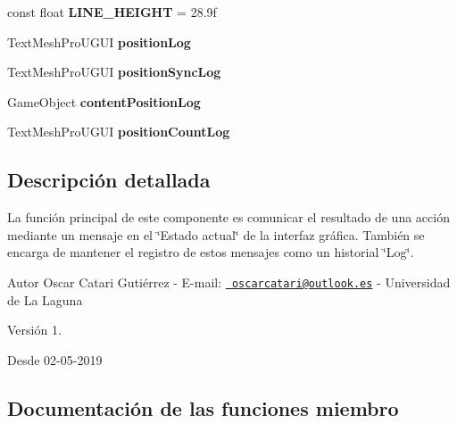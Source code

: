 \begin{DoxyCompactItemize}
const float {\bfseries L\+I\+N\+E\+\_\+\+H\+E\+I\+G\+HT} = 28.\+9f
\item 
\mbox{\label{class_state_message_control_ac3808f5bbfee4c03f97f27403c8b763b}} 
Text\+Mesh\+Pro\+U\+G\+UI {\bfseries position\+Log}
\item 
\mbox{\label{class_state_message_control_a6af53a37d357fe8ab24b6216a47e7189}} 
Text\+Mesh\+Pro\+U\+G\+UI {\bfseries position\+Sync\+Log}
\item 
\mbox{\label{class_state_message_control_ae8266da9f98d4560b5532f791e3359fe}} 
Game\+Object {\bfseries content\+Position\+Log}
\item 
\mbox{\label{class_state_message_control_a392f5ccb1932f006cb72209201c4480f}} 
Text\+Mesh\+Pro\+U\+G\+UI {\bfseries position\+Count\+Log}
\end{DoxyCompactItemize}


\subsection{Descripción detallada}
La función principal de este componente es comunicar el resultado de una acción mediante un mensaje en el \char`\"{}\+Estado actual\char`\"{} de la interfaz gráfica. También se encarga de mantener el registro de estos mensajes como un historial \char`\"{}\+Log\char`\"{}. \begin{DoxyAuthor}{Autor}
Oscar Catari Gutiérrez -\/ E-\/mail\+: \href{mailto:oscarcatari@outlook.es}{\texttt{ oscarcatari@outlook.\+es}} -\/ Universidad de La Laguna 
\end{DoxyAuthor}
\begin{DoxyVersion}{Versión}
1. 
\end{DoxyVersion}
\begin{DoxySince}{Desde}
02-\/05-\/2019 
\end{DoxySince}


\subsection{Documentación de las funciones miembro}
\mbox{\label{class_state_message_control_a251349ec61d12eff0a0dbb4871991c94}} 

